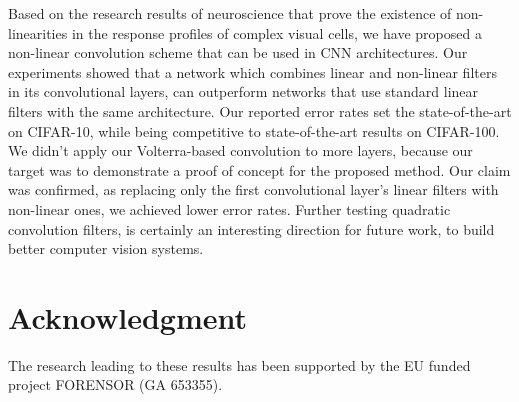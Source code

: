 \documentclass[10pt,twocolumn,letterpaper]{article}
\begin{document}
     Based on the research results of neuroscience that prove the existence of non-linearities in the response profiles of complex visual cells, we have proposed a non-linear convolution scheme that can be used in CNN architectures. Our experiments showed that a network which combines linear and non-linear filters in its convolutional layers, can outperform networks that use standard linear filters with the same architecture. Our reported error rates set the state-of-the-art on CIFAR-10, while being competitive to state-of-the-art results on CIFAR-100. We didn't apply our Volterra-based convolution to more layers, because our target was to demonstrate a proof of concept for the proposed method. Our claim was confirmed, as replacing only the first convolutional layer's linear filters with non-linear ones, we achieved lower error rates. Further testing quadratic convolution filters, is certainly an interesting direction for future work, to build better computer vision systems.


\section*{Acknowledgment}

   The research leading to these results has been supported by the EU funded project FORENSOR (GA 653355).



{\small


}
\end{document}

